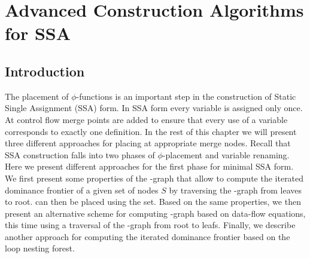 \chapter{Advanced Construction Algorithms for SSA
   }
\label{chapter:alternative_ssa_construction_algorithms}

{

\def\p{$\phi$}
\def\st#1{\rlap{\raisebox{3.4pt}{\kern3pt{\scriptsize\it #1}}}{\rightarrow}}
\def\stplus{\rlap{\raisebox{3.4pt}{\kern3pt{\scriptsize+}}}{\rightarrow}}
\def\St#1{\rlap{\raisebox{3.4pt}{\kern3pt{\scriptsize\it #1}}}{\Rightarrow}}
\def\depth{\textrm{depth}}
\newcommand\subtree[1]{\textsf{subtree}(#1)}

\def\p{$\phi$}
\def\iDFfwd{\iDF\!\!_{\textit{fwd}}}


\section{Introduction}

The placement of $\phi$-functions is an important step in the construction of Static Single Assignment (SSA) form. 
In SSA form every variable is assigned only once. 
At control flow merge points \phifuns are added to ensure that every use of a variable corresponds to exactly one definition. 
In the rest of this chapter we will present three different approaches for placing \phifuns at appropriate merge nodes. 
Recall that SSA construction falls into two phases of $\phi$-placement and variable renaming. 
Here we present different approaches for the first phase for minimal SSA form. 
We first present some properties of the \DJ-graph that allow to compute the iterated dominance frontier of a given set of nodes $S$ by traversing the \DJ-graph from leaves to root. 
\phifuns can then be placed using the \iDF set. 
Based on the same properties, we then present an alternative scheme for computing \iDF-graph based on data-flow equations, this time using a traversal of the \DJ-graph from root to leafs. 
Finally, we describe another approach for computing the iterated dominance frontier based on the loop nesting forest.

}
